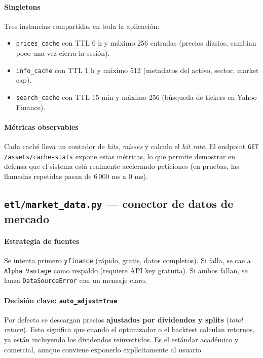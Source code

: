 \documentclass[11pt,a4paper]{article}
\begin{document}
\paragraph{Singletons}
Tres instancias compartidas en toda la aplicación:

\begin{itemize}
  \item \texttt{prices\_cache} con TTL 6 h y máximo 256 entradas (precios diarios, cambian poco una vez cierra la sesión).
  \item \texttt{info\_cache} con TTL 1 h y máximo 512 (metadatos del activo, sector, market cap).
  \item \texttt{search\_cache} con TTL 15 min y máximo 256 (búsqueda de tickers en Yahoo Finance).
\end{itemize}

\paragraph{Métricas observables}
Cada caché lleva un contador de \textit{hits}, \textit{misses} y calcula el \textit{hit rate}. El endpoint \texttt{GET /assets/cache-stats} expone estas métricas, lo que permite demostrar en defensa que el sistema está realmente acelerando peticiones (en pruebas, las llamadas repetidas pasan de 6\,000 ms a 0 ms).

\subsection{\texttt{etl/market\_data.py} — conector de datos de mercado}

\paragraph{Estrategia de fuentes}
Se intenta primero \texttt{yfinance} (rápido, gratis, datos completos). Si falla, se cae a \texttt{Alpha Vantage} como respaldo (requiere API key gratuita). Si ambos fallan, se lanza \texttt{DataSourceError} con un mensaje claro.

\paragraph{Decisión clave: \texttt{auto\_adjust=True}}
Por defecto se descargan precios \textbf{ajustados por dividendos y splits} (\textit{total return}). Esto significa que cuando el optimizador o el backtest calculan retornos, ya están incluyendo los dividendos reinvertidos. Es el estándar académico y comercial, aunque conviene exponerlo explícitamente al usuario.
\end{document}
